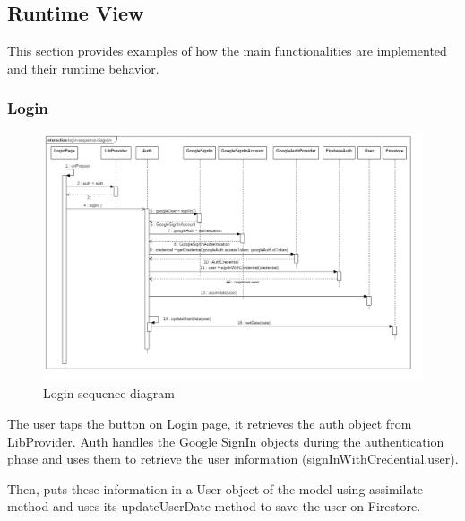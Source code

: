 \subsection{Runtime View}
This section provides examples of how the main functionalities are implemented and their runtime behavior.
\subsubsection{Login}
\begin{figure}[!h]
    \centering
    \includegraphics[scale=0.4]{images/login-sequence-diagram.png}
    \caption{Login sequence diagram}
    \label{ref:loginsequencediagram}
\end{figure}
The user taps the button on Login page, it retrieves the auth object from LibProvider. 
Auth handles the Google SignIn objects during the authentication phase and 
uses them to retrieve the user information (signInWithCredential.user).

Then, puts these information in a User object of the model using assimilate method and 
uses its updateUserDate method to save the user on Firestore.
\clearpage
